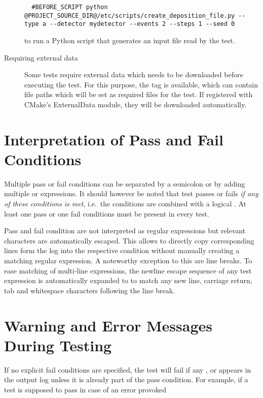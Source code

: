 \begin{description}
  \begin{verbatim}
  #BEFORE_SCRIPT python @PROJECT_SOURCE_DIR@/etc/scripts/create_deposition_file.py --type a --detector mydetector --events 2 --steps 1 --seed 0
  \end{verbatim}
  to run a Python script that generates an input file read by the test.
  \item[Requiring external data] Some tests require external data which needs to be downloaded before executing the test. For this purpose, the  tag is available, which can contain file paths which will be set as required files for the test. If registered with CMake's ExternalData module, they will be downloaded automatically.
\end{description}

\section{Interpretation of Pass and Fail Conditions}

Multiple pass or fail conditions can be separated by a semicolon or by adding multiple  or  expressions.
It should however be noted that test passes or fails \emph{if any of these conditions is met}, i.e.\ the conditions are combined with a logical .
At least one pass or one fail conditions must be present in every test.

Pass and fail condition are not interpreted as regular expressions but relevant characters are automatically escaped.
This allows to directly copy corresponding lines form the log into the respective condition without manually creating a matching regular expression.
A noteworthy exception to this are line breaks.
To ease matching of multi-line expressions, the newline escape sequence \parameter{\n} of any test expression is automatically expanded to \parameter{[\r\n\t ]*} to match any new line, carriage return, tab and whitespace characters following the line break.

\section{Warning and Error Messages During Testing}

If no explicit fail conditions are specified, the test will fail if any ,  or  appears in the output log unless it is already part of the pass condition.
For example, if a test is supposed to pass in case of an error provoked

